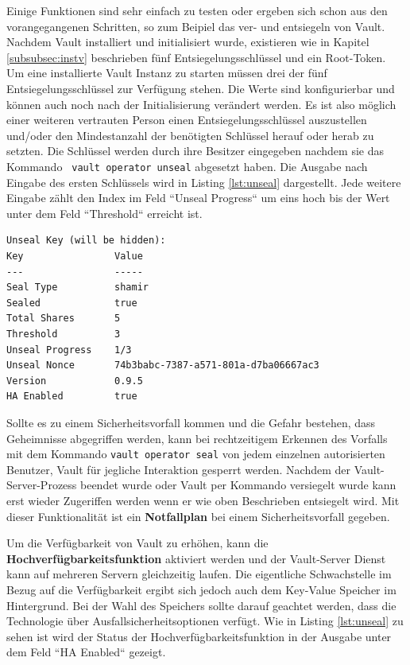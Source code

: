 \documentclass[
book,
a4paper,   
titlepage,  
halfparskip,
12pt        
]{scrartcl}
\newcommand\inline{\lstinline[basicstyle=\ttfamily]}
\begin{document}
\begin{onehalfspacing}
Einige Funktionen sind sehr einfach zu testen oder ergeben sich schon aus den vorangegangenen Schritten, so zum Beipiel das ver- und entsiegeln von Vault. Nachdem Vault installiert und initialisiert wurde, existieren wie in Kapitel \vref{subsubsec:instv} beschrieben fünf Entsiegelungsschlüssel und ein Root-Token. Um eine installierte Vault Instanz zu starten müssen drei der fünf Entsiegelungsschlüssel zur Verfügung stehen. Die Werte sind konfigurierbar und können auch noch nach der Initialisierung verändert werden. Es ist also möglich einer weiteren vertrauten Person einen Entsiegelungsschlüssel auszustellen und/oder den Mindestanzahl der benötigten Schlüssel herauf oder herab zu setzten. Die Schlüssel werden durch ihre Besitzer eingegeben nachdem sie das Kommando \inline| vault operator unseal| abgesetzt haben. Die Ausgabe nach Eingabe des ersten Schlüssels wird in Listing \vref{lst:unseal} dargestellt. Jede weitere Eingabe zählt den Index im Feld ``Unseal Progress`` um eins hoch bis der Wert unter dem Feld ``Threshold`` erreicht ist. 
\begin{lstlisting}[caption={[Entsiegelungsprozess] Erster Schritt im Entsiegelungsprozess von Vault}, label=lst:unseal, captionpos=b, basicstyle=\ttfamily] 
Unseal Key (will be hidden): 
Key                Value
---                -----
Seal Type          shamir
Sealed             true
Total Shares       5
Threshold          3
Unseal Progress    1/3
Unseal Nonce       74b3babc-7387-a571-801a-d7ba06667ac3
Version            0.9.5
HA Enabled         true
\end{lstlisting}
Sollte es zu einem Sicherheitsvorfall kommen und die Gefahr bestehen, dass Geheimnisse abgegriffen werden, kann bei rechtzeitigem Erkennen des Vorfalls mit dem Kommando \inline|vault operator seal| von jedem einzelnen autorisierten Benutzer, Vault für jegliche Interaktion gesperrt werden. Nachdem der Vault-Server-Prozess beendet wurde oder Vault per Kommando versiegelt wurde kann erst wieder Zugeriffen werden wenn er wie oben Beschrieben entsiegelt wird. Mit dieser Funktionalität ist ein \textbf{Notfallplan} bei einem Sicherheitsvorfall gegeben.

Um die Verfügbarkeit von Vault zu erhöhen, kann die \textbf{Hochverfügbarkeitsfunktion} aktiviert werden und der Vault-Server Dienst kann auf mehreren Servern gleichzeitig laufen. Die eigentliche Schwachstelle im Bezug auf die Verfügbarkeit ergibt sich jedoch auch dem Key-Value Speicher im Hintergrund. Bei der Wahl des Speichers sollte darauf geachtet werden, dass die Technologie über Ausfallsicherheitsoptionen verfügt. Wie in Listing \vref{lst:unseal} zu sehen ist wird der Status der Hochverfügbarkeitsfunktion in der Ausgabe unter dem Feld ``HA Enabled`` gezeigt.


\end{onehalfspacing}
\end{document}
